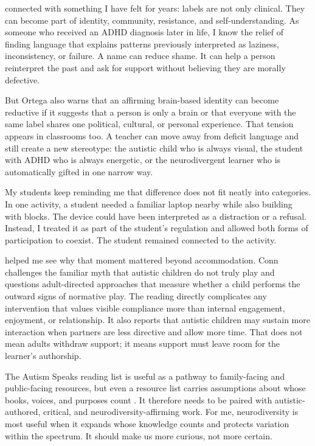 
\citet{ortega2013cerebralizing} connected with something I have felt for years: labels are not only clinical. They can become part of identity, community, resistance, and self-understanding. As someone who received an ADHD diagnosis later in life, I know the relief of finding language that explains patterns previously interpreted as laziness, inconsistency, or failure. A name can reduce shame. It can help a person reinterpret the past and ask for support without believing they are morally defective.

But Ortega also warns that an affirming brain-based identity can become reductive if it suggests that a person is only a brain or that everyone with the same label shares one political, cultural, or personal experience. That tension appears in classrooms too. A teacher can move away from deficit language and still create a new stereotype: the autistic child who is always visual, the student with ADHD who is always energetic, or the neurodivergent learner who is automatically gifted in one narrow way.

My students keep reminding me that difference does not fit neatly into categories. In one activity, a student needed a familiar laptop nearby while also building with blocks. The device could have been interpreted as a distraction or a refusal. Instead, I treated it as part of the student's regulation and allowed both forms of participation to coexist. The student remained connected to the activity.

\citet{conn2016play} helped me see why that moment mattered beyond accommodation. Conn challenges the familiar myth that autistic children do not truly play and questions adult-directed approaches that measure whether a child performs the outward signs of normative play. The reading directly complicates any intervention that values visible compliance more than internal engagement, enjoyment, or relationship. It also reports that autistic children may sustain more interaction when partners are less directive and allow more time. That does not mean adults withdraw support; it means support must leave room for the learner's authorship.

The Autism Speaks reading list is useful as a pathway to family-facing and public-facing resources, but even a resource list carries assumptions about whose books, voices, and purposes count \citep{autismSpeaksReads}. It therefore needs to be paired with autistic-authored, critical, and neurodiversity-affirming work. For me, neurodiversity is most useful when it expands whose knowledge counts and protects variation within the spectrum. It should make us more curious, not more certain.

